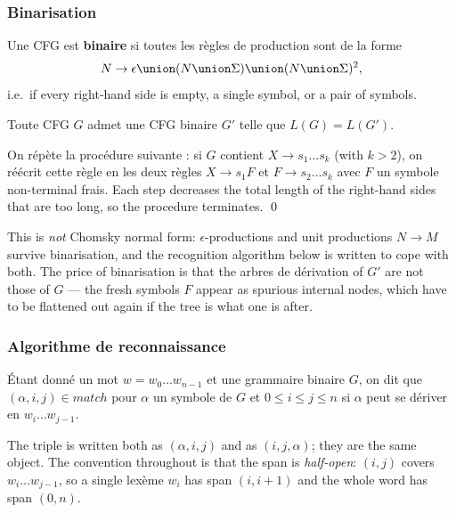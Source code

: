 \subsubsection{Binarisation}
\begin{definition}
  Une CFG est \textbf{binaire} si toutes les règles de production sont de la
  forme
  \[
    N \to \epsilon \union (N \union \Sigma) \union (N \union \Sigma)^{2} ,
  \]
  i.e.\ if every right-hand side is empty, a single symbol, or a pair of
  symbols.
\end{definition}

\begin{theorem}[Binarisation]
  Toute CFG $G$ admet une CFG binaire $G'$ telle que $L(G) = L(G')$.
\end{theorem}

\begin{proofsketch}
  On répète la procédure suivante : si $G$ contient $X \to s_{1} \dots s_{k}$
  (with $k > 2$), on réécrit cette règle en les deux règles $X \to s_{1}F$ et
  $F \to s_{2} \dots s_{k}$ avec $F$ un symbole non-terminal frais. Each step
  decreases the total length of the right-hand sides that are too long, so the
  procedure terminates. \qed
\end{proofsketch}

\begin{remark}
  This is \emph{not} Chomsky normal form: $\epsilon$-productions and unit
  productions $N \to M$ survive binarisation, and the recognition algorithm
  below is written to cope with both. The price of binarisation is that the
  arbres de dérivation of $G'$ are not those of $G$ --- the fresh symbols $F$
  appear as spurious internal nodes, which have to be flattened out again if the
  tree is what one is after.
\end{remark}

\subsubsection{Algorithme de reconnaissance}
\begin{definition}
  Étant donné un mot $w = w_{0} \dots w_{n-1}$ et une grammaire binaire $G$, on
  dit que $(\alpha, i, j) \in \mathit{match}$ pour $\alpha$ un symbole de $G$ et
  $0 \leq i \leq j \leq n$ si $\alpha$ peut se dériver en
  $w_{i} \dots w_{j-1}$.
\end{definition}

\begin{notation}
  The triple is written both as $(\alpha,i,j)$ and as $(i,j,\alpha)$; they
  are the same object. The convention throughout is that the span is
  \emph{half-open}: $(i,j)$ covers $w_{i} \dots w_{j-1}$, so a single lexème
  $w_{i}$ has span $(i,i+1)$ and the whole word has span $(0,n)$.
\end{notation}

